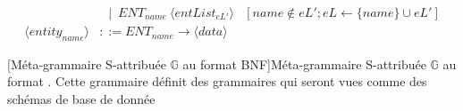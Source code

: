 \begin{landscape}
\begin{adjustbox}{max width=\linewidth,max height=.95\textheight,valign=c}
{\begin{align}
                                                            & ~~ \mid ~ ENT_{name} ~ \langle entList_{eL'} \rangle                                                                                                                                                                                                                                                                                                                                         & [name \notin eL'; eL \gets \{name\} \cup eL']                                                                     \label{meta:entList:2}  \\
                \langle entity_{name} \rangle               & ::= ENT_{name} \to \langle data \rangle \label{meta:entity}
            \end{align}}
    \end{adjustbox}
    [Méta-grammaire S-attribuée $\mathbb{G}$ au format BNF]{Méta-grammaire S-attribuée $\mathbb{G}$ au format . Cette grammaire définit des grammaires qui seront vues comme des schémas de base de donnée \label{table:struct:meta}}
\end{landscape}

